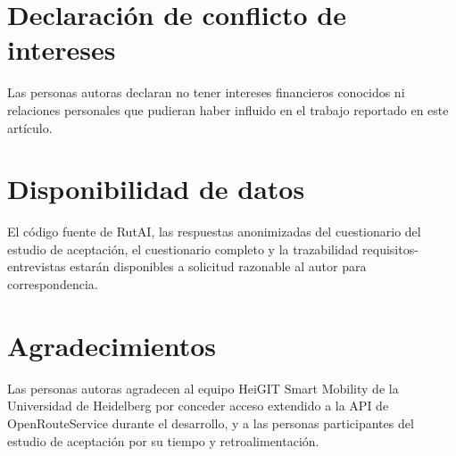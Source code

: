 \documentclass[a4paper,fleqn]{cas-sc}
\newcommand{\RUTAI}{RutAI\xspace}
\begin{document}
	\printcredits
	
	\section*{Declaraci\'on de conflicto de intereses}
	Las personas autoras declaran no tener intereses financieros conocidos ni relaciones personales que pudieran haber influido en el trabajo reportado en este art\'iculo.
	
	\section*{Disponibilidad de datos}
	El c\'odigo fuente de \RUTAI, las respuestas anonimizadas del cuestionario del estudio de aceptaci\'on, el cuestionario completo y la trazabilidad requisitos-entrevistas estar\'an disponibles a solicitud razonable al autor para correspondencia.
	
	\section*{Agradecimientos}
	Las personas autoras agradecen al equipo HeiGIT Smart Mobility de la Universidad de Heidelberg por conceder acceso extendido a la API de OpenRouteService durante el desarrollo, y a las personas participantes del estudio de aceptaci\'on por su tiempo y retroalimentaci\'on.
	
	
	
	
\end{document}
